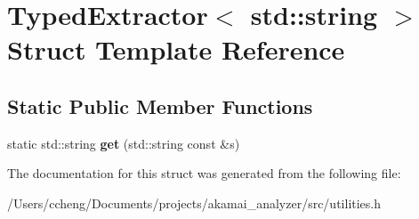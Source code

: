 \hypertarget{struct_typed_extractor_3_01std_1_1string_01_4}{}\section{Typed\+Extractor$<$ std\+:\+:string $>$ Struct Template Reference}
\label{struct_typed_extractor_3_01std_1_1string_01_4}
\subsection*{Static Public Member Functions}
\begin{DoxyCompactItemize}
\item 
\mbox{\label{struct_typed_extractor_3_01std_1_1string_01_4_a4fca773b4ec62eaccd47ecb4e8e64010}} 
static std\+::string {\bfseries get} (std\+::string const \&s)
\end{DoxyCompactItemize}


The documentation for this struct was generated from the following file\+:\begin{DoxyCompactItemize}
\item 
/\+Users/ccheng/\+Documents/projects/akamai\+\_\+analyzer/src/utilities.\+h\end{DoxyCompactItemize}
